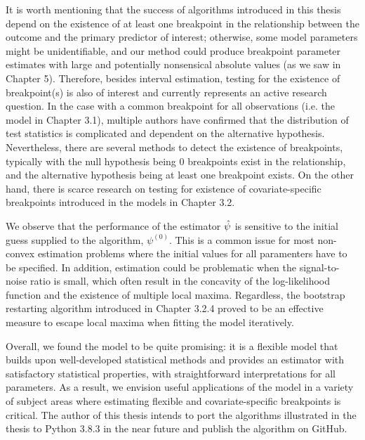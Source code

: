 \documentclass [12pt, proquest] {uwthesis}[2016/11/22]
\begin{document}
It is worth mentioning that the success of algorithms introduced in this thesis depend on the existence of at least one breakpoint in the relationship between the outcome and the primary predictor of interest; otherwise, some model parameters might be unidentifiable, and our method could produce breakpoint parameter estimates with large and potentially nonsensical absolute values (as we saw in Chapter 5). Therefore, besides interval estimation, testing for the existence of breakpoint(s) is also of interest and currently represents an active research question. In the case with a common breakpoint for all observations (i.e. the model in Chapter 3.1), multiple authors have confirmed that the distribution of test statistics is complicated and dependent on the alternative hypothesis. Nevertheless, there are several methods to detect the existence of breakpoints, typically with the null hypothesis being 0 breakpoints exist in the relationship, and the alternative hypothesis being at least one breakpoint exists. 
On the other hand, there is scarce research on testing for existence of covariate-specific breakpoints introduced in the models in Chapter 3.2.

We observe that the performance of the estimator $\Hat{\psi}$ is sensitive to the initial guess supplied to the algorithm, $\psi^{(0)}$. This is a common issue for most non-convex estimation problems where the initial values for all paramenters have to be specified. In addition, estimation could be problematic when the signal-to-noise ratio is small, which often result in the concavity of the log-likelihood function and the existence of multiple local maxima. Regardless, the bootstrap restarting algorithm introduced in Chapter 3.2.4 proved to be an effective measure to escape local maxima when fitting the model iteratively.

Overall, we found the model to be quite promising: it is a flexible model that builds upon well-developed statistical methods and provides an estimator with satisfactory statistical properties, with straightforward interpretations for all parameters. As a result, we envision useful applications of the model in a variety of subject areas where estimating flexible and covariate-specific breakpoints is critical. The author of this thesis intends to port the algorithms illustrated in the thesis to Python 3.8.3 in the near future and publish the algorithm on GitHub.


%
%
\nocite{*}   %


%
%
\appendix
\raggedbottom\sloppy
\end{document}

